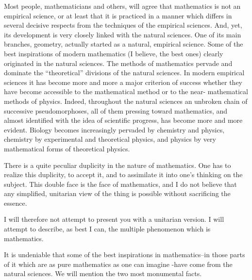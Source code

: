 \documentclass{article}
\begin{document}
Most people, mathematicians and others, will agree that mathematics is not an empirical science, or at least that it is practiced in a manner which differs in several decisive respects from the techniques of the empirical sciences. And, yet, its development is very closely linked with the natural sciences. One of its main branches, geometry, actually started as a natural, empirical science. Some of the best inspirations of modern mathematics (I believe, the best ones) clearly originated in the natural sciences. The methods of mathematics pervade and dominate the ``theoretical'' divisions of the natural sciences. In modern empirical sciences it has become more and more a major criterion of success whether they have become accessible to the mathematical method or to the near- mathematical methods of physics. Indeed, throughout the natural sciences an unbroken chain of successive pseudomorphoses, all of them pressing toward mathematics, and almost identified with the idea of scientific progress, has become more and more evident. Biology becomes increasingly pervaded by chemistry and physics, chemistry by experimental and theoretical physics, and physics by very mathematical forms of theoretical physics.

There is a quite peculiar duplicity in the nature of mathematics. One has to realize this duplicity, to accept it, and to assimilate it into one's thinking on the subject. This double face is the face of mathematics, and I do not believe that any simplified, unitarian view of the thing is possible without sacrificing the essence.

I will therefore not attempt to present you with a unitarian version. I will attempt to describe, as best I can, the multiple phenomenon which is mathematics.

It is undeniable that some of the best inspirations in mathematics--in those parts of it which are as pure mathematics as one can imagine -have come from the natural sciences. We will mention the two most monumental facts.
\end{document}
